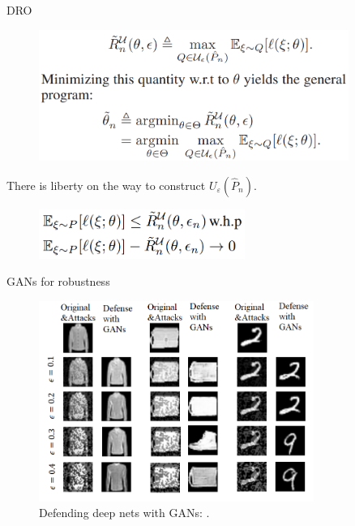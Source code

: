 \documentclass{beamer}
\begin{document}
\begin{frame}{DRO}
    \begin{figure}
    \includegraphics[width=0.90\textwidth]{images/dro_objective.PNG}
    \end{figure}
    There is liberty on the way to construct $U_\varepsilon(\hat{P}_n)$.
    \begin{figure}
    \includegraphics[width=0.6\textwidth]{images/dro_guarantees.PNG}
    \end{figure}
\end{frame}

\begin{frame}{GANs for robustness}
    \begin{figure}
    \includegraphics[width=0.80\textwidth]{images/defenseGANs.png}
    \caption{Defending deep nets with GANs: \cite{samangouei2018defense}.}
    \end{figure}
\end{frame}

\end{document}
